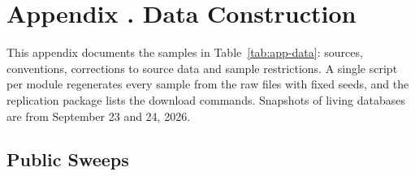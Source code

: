 \section[Data Construction]{Appendix \thesection. Data Construction}\label{app:data}
\setlength{\emergencystretch}{2em}%

This appendix documents the samples in Table~\ref{tab:app-data}: sources, conventions, corrections to source data and
sample restrictions. A single script per module regenerates every sample from the raw files with fixed seeds, and the
replication package lists the download commands. Snapshots of living databases are from September 23 and 24, 2026.



\subsection{Public Sweeps}\label{app:sweeps}

